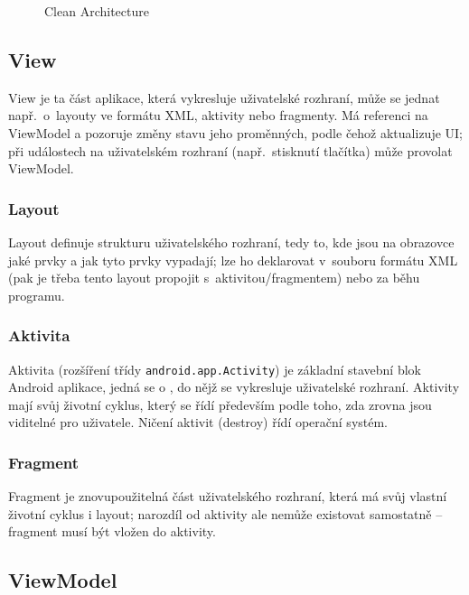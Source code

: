 \documentclass[twoside]{ctuthesis}
\begin{document}
\begin{enumerate}[label=\textbf{O\arabic*.}]
\begin{figure}[h!]
	
	\caption{Clean Architecture}
	\label{fig:clean-architecture}
\end{figure}


\subsection{View}

View je ta část aplikace, která vykresluje uživatelské rozhraní, může se jednat např.~o~layouty ve formátu XML, aktivity nebo fragmenty. Má referenci na ViewModel a pozoruje změny stavu jeho proměnných, podle čehož aktualizuje UI; při událostech na uživatelském rozhraní (např.~stisknutí tlačítka) může provolat ViewModel.

\subsubsection{Layout}

Layout definuje strukturu uživatelského rozhraní, tedy to, kde jsou na obrazovce jaké prvky a jak tyto prvky vypadají; lze ho deklarovat v~souboru formátu XML (pak je třeba tento layout propojit s~aktivitou/fragmentem) nebo za běhu programu. \cite{android2020layouts}

\subsubsection{Aktivita}

Aktivita (rozšíření třídy \texttt{android.app.Activity}) je základní stavební blok Android aplikace, jedná se o , do nějž se vykresluje uživatelské rozhraní. Aktivity mají svůj životní cyklus, který se řídí především podle toho, zda zrovna jsou viditelné pro uživatele. Ničení aktivit (destroy) řídí operační systém. \cite{android2020activity}

\subsubsection{Fragment}

Fragment je znovupoužitelná část uživatelského rozhraní, která má svůj vlastní životní cyklus i layout; narozdíl od aktivity ale nemůže existovat samostatně -- fragment musí být vložen do aktivity. \cite{android2020fragments}

\subsection{ViewModel}


\end{enumerate}
\end{document}
